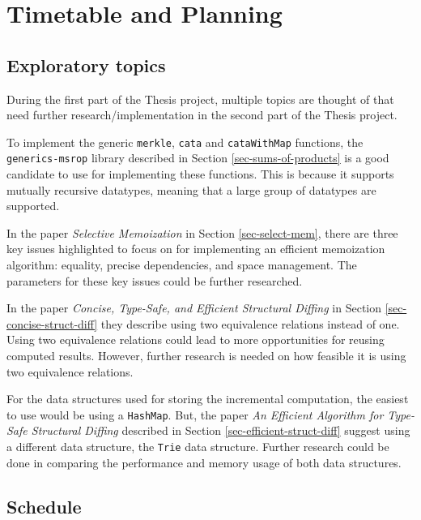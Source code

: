 \section{Timetable and Planning}
\subsection{Exploratory topics}
During the first part of the Thesis project, multiple topics are thought of that need further research/implementation in the second part of the Thesis project.

To implement the generic \texttt{merkle}, \texttt{cata} and \texttt{cataWithMap} functions, the \texttt{generics-msrop} library described in Section \ref{sec-sums-of-products} is a good candidate to use for implementing these functions. This is because it supports mutually recursive datatypes, meaning that a large group of datatypes are supported. 

In the paper \textit{Selective Memoization} in Section \ref{sec-select-mem}, there are three key issues highlighted to focus on for implementing an efficient memoization algorithm: equality, precise dependencies, and space management. The parameters for these key issues could be further researched.

In the paper \textit{Concise, Type-Safe, and Efficient Structural Diffing} in Section \ref{sec-concise-struct-diff} they describe using two equivalence relations instead of one. Using two equivalence relations could lead to more opportunities for reusing computed results. However, further research is needed on how feasible it is using two equivalence relations. 

For the data structures used for storing the incremental computation, the easiest to use would be using a \texttt{HashMap}. But, the paper \textit{An Efficient Algorithm for Type-Safe Structural Diffing} described in Section \ref{sec-efficient-struct-diff} suggest using a different data structure, the \texttt{Trie} data structure. Further research could be done in comparing the performance and memory usage of both data structures.

\newpage
\subsection{Schedule}


